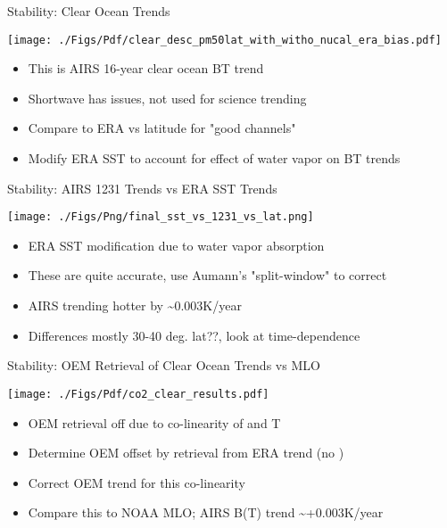 \documentclass[10pt,t]{beamer}
\begin{document}
\begin{frame}[label={sec:org0b23d7d}]{Stability: Clear Ocean Trends}
\vspace{-0.08in}
\begin{center}
\texttt{[image: ./Figs/Pdf/clear\_desc\_pm50lat\_with\_witho\_nucal\_era\_bias.pdf]}
\end{center}

\vspace{-0.12in}
\begin{itemize}
\item \small This is AIRS 16-year clear ocean BT trend
\item \small Shortwave has issues, not used for science trending
\item \small Compare to ERA vs latitude for "good channels"
\item \small Modify ERA SST to account for effect of water vapor on BT trends
\end{itemize}
\end{frame}

\begin{frame}[label={sec:org0be84c5}]{Stability: AIRS 1231 \wn Trends vs ERA SST Trends}
\vspace{-0.08in}
\begin{center}
\texttt{[image: ./Figs/Png/final\_sst\_vs\_1231\_vs\_lat.png]}
\end{center}

\vspace{-0.12in}
\begin{itemize}
\item \small ERA SST modification due to water vapor absorption
\item \small These are quite accurate, use Aumann's "split-window" to correct
\item \small AIRS trending hotter by \textasciitilde{}0.003K/year
\item \small Differences mostly 30-40 deg. lat??, look at time-dependence
\end{itemize}
\end{frame}

\begin{frame}[label={sec:org9ad5ad8}]{Stability: OEM Retrieval of Clear Ocean \cd Trends vs MLO}
\vspace{-0.08in}
\begin{center}
\texttt{[image: ./Figs/Pdf/co2\_clear\_results.pdf]}
\end{center}

\vspace{-0.12in}
\begin{itemize}
\item \small OEM retrieval off due to co-linearity of \cd and T
\item \small Determine OEM offset by retrieval \cd from ERA trend (no \cd)
\item \small Correct OEM \cd trend for this co-linearity
\item \small Compare this to NOAA MLO;  AIRS B(T) trend \textasciitilde{}+0.003K/year
\end{itemize}
\end{frame}
\end{document}

